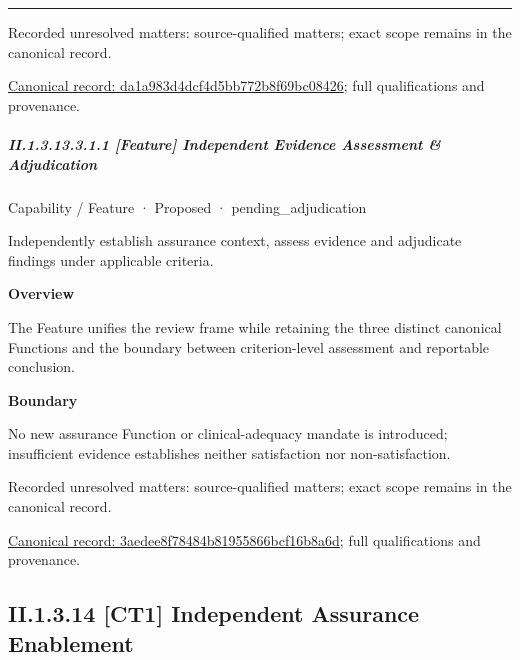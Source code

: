 \medskip\hrule\medskip

{\small Recorded unresolved matters: source-qualified matters; exact scope remains in the canonical record.}\par
{\footnotesize \href{../../../../continuum/strategy/capability/da1a983d4dcf4d5bb772b8f69bc08426.md}{Canonical record: da1a983d4dcf4d5bb772b8f69bc08426}; full qualifications and provenance.}\par
\subparagraph*{II.1.3.13.3.1.1 [Feature] Independent Evidence Assessment \& Adjudication}
\label{navigation:II.1.3.13.3.1.1}

\label{element:3aedee8f78484b81955866bcf16b8a6d}
{\small Capability / Feature · Proposed · pending\_adjudication}\par

Independently establish assurance context, assess evidence and adjudicate findings under applicable criteria.



\textbf{Overview}



The Feature unifies the review frame while retaining the three distinct canonical Functions and the boundary between criterion-level assessment and reportable conclusion.



\textbf{Boundary}



No new assurance Function or clinical-adequacy mandate is introduced; insufficient evidence establishes neither satisfaction nor non-satisfaction.


{\small Recorded unresolved matters: source-qualified matters; exact scope remains in the canonical record.}\par
{\footnotesize \href{../../../../continuum/strategy/capability/feature/3aedee8f78484b81955866bcf16b8a6d.md}{Canonical record: 3aedee8f78484b81955866bcf16b8a6d}; full qualifications and provenance.}\par
\subsection*{II.1.3.14 [CT1] Independent Assurance Enablement}
\label{navigation:II.1.3.14}

